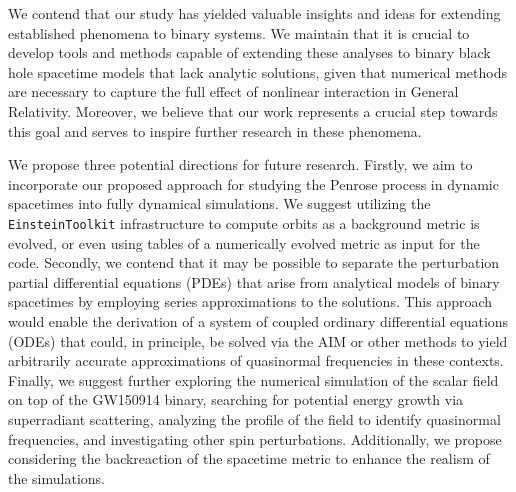 We contend that our study has yielded valuable insights and ideas for extending established phenomena to binary systems. We maintain that it is crucial to develop tools and methods capable of extending these analyses to binary black hole spacetime models that lack analytic solutions, given that numerical methods are necessary to capture the full effect of nonlinear interaction in General Relativity. Moreover, we believe that our work represents a crucial step towards this goal and serves to inspire further research in these phenomena.

We propose three potential directions for future research. Firstly, we aim to incorporate our proposed approach for studying the Penrose process in dynamic spacetimes into fully dynamical simulations. We suggest utilizing the \texttt{EinsteinToolkit} infrastructure to compute orbits as a background metric is evolved, or even using tables of a numerically evolved metric as input for the code. Secondly, we contend that it may be possible to separate the perturbation partial differential equations (PDEs) that arise from analytical models of binary spacetimes by employing series approximations to the solutions. This approach would enable the derivation of a system of coupled ordinary differential equations (ODEs) that could, in principle, be solved via the \ac{AIM} or other methods to yield arbitrarily accurate approximations of quasinormal frequencies in these contexts. Finally, we suggest further exploring the numerical simulation of the scalar field on top of the GW150914 binary, searching for potential energy growth via superradiant scattering, analyzing the profile of the field to identify quasinormal frequencies, and investigating other spin perturbations. Additionally, we propose considering the backreaction of the spacetime metric to enhance the realism of the simulations.